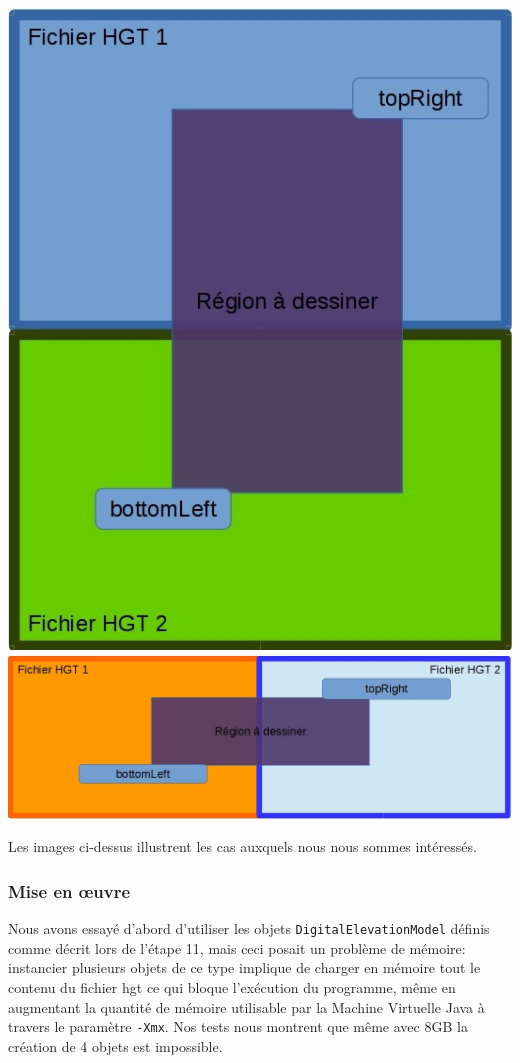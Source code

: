 \documentclass[11pt,a4paper]{article}
\begin{document}
\begin{center}
\includegraphics[scale=0.3]{schema4files1.jpg}
\includegraphics[scale=0.3]{schema4files2.jpg}
\end{center}

Les images ci-dessus illustrent les cas auxquels nous nous sommes intéressés.

\subsubsection*{Mise en œuvre}
Nous avons essayé d'abord d'utiliser les objets \texttt{DigitalElevationModel} définis comme décrit lors de l'étape 11, mais ceci posait un problème de mémoire: instancier plusieurs objets de ce type implique de charger en mémoire tout le contenu du fichier hgt ce qui bloque l'exécution du programme, même en augmentant la quantité de mémoire utilisable par la Machine Virtuelle Java à travers le paramètre \texttt{-Xmx}. Nos tests nous montrent que même avec 8GB la création de 4 objets est impossible.
\end{document}
